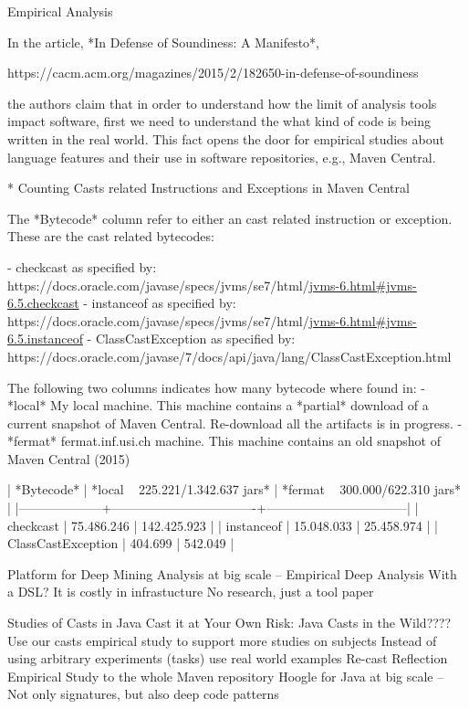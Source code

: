 Empirical Analysis


In the article, *In Defense of Soundiness: A Manifesto*,

https://cacm.acm.org/magazines/2015/2/182650-in-defense-of-soundiness

the authors claim that in order to understand how the limit of analysis tools impact software,
first we need to understand the what kind of code is being written in the real world.
This fact opens the door for empirical studies about language features and their use in
software repositories, e.g., Maven Central.


* Counting Casts related Instructions and Exceptions in Maven Central

The *Bytecode* column refer to either an cast related instruction or exception.
These are the cast related bytecodes:

- checkcast as specified by:
https://docs.oracle.com/javase/specs/jvms/se7/html/\url{jvms-6.html#jvms-6.5.checkcast}
- instanceof as specified by:
https://docs.oracle.com/javase/specs/jvms/se7/html/\url{jvms-6.html#jvms-6.5.instanceof}
- ClassCastException as specified by:
https://docs.oracle.com/javase/7/docs/api/java/lang/ClassCastException.html

The following two columns indicates how many bytecode where found in:
- *local*
My local machine.
This machine contains a *partial* download of a current snapshot of Maven Central.
Re-download all the artifacts is in progress.
- *fermat*
fermat.inf.usi.ch machine.
This machine contains an old snapshot of Maven Central (2015)

| *Bytecode*         | *local ~ 225.221/1.342.637 jars* | *fermat ~ 300.000/622.310 jars* |
|--------------------+----------------------------------+---------------------------------|
| checkcast          |                       75.486.246 |                     142.425.923 |
| instanceof         |                       15.048.033 |                      25.458.974 |
| ClassCastException |                          404.699 |                         542.049 |

Platform for Deep Mining Analysis at big scale -- Empirical Deep Analysis
With a DSL?
It is costly in infrastucture
No research, just a tool paper

Studies of Casts in Java
Cast it at Your Own Risk: Java Casts in the Wild????
Use our casts empirical study to support more studies on subjects
Instead of using arbitrary experiments (tasks) use real world examples
Re-cast Reflection Empirical Study to the whole Maven repository
Hoogle for Java at big scale -- Not only signatures, but also deep code patterns

